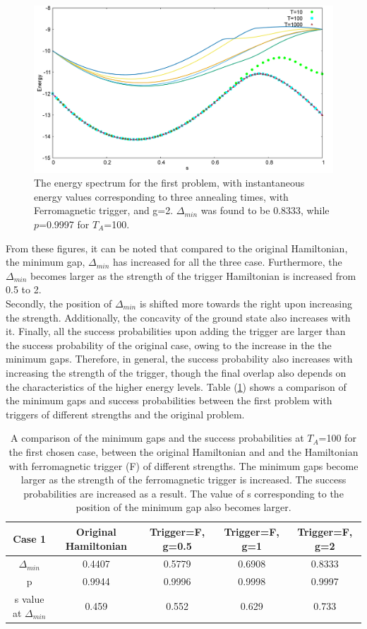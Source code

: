 \documentclass[12]{article}
\begin{document}
\begin{figure}[H]
\centering 
\includegraphics[scale=0.3]{733_s12_F_g2.png}
\caption{The energy spectrum for the first problem, with instantaneous energy values corresponding to three annealing times, with Ferromagnetic trigger, and g=2. $\Delta_{min}$ was found to be 0.8333, while $p$=0.9997 for $T_A$=100.}
\label{fig:f3}
\end{figure}
From these figures, it can be noted that compared to the original Hamiltonian, the minimum gap, $\Delta_{min}$ has increased for all the three case. Furthermore, the $\Delta_{min}$ becomes larger as the strength of the trigger Hamiltonian is increased from 0.5 to 2. \\
Secondly, the position of $\Delta_{min}$ is shifted more towards the right upon increasing the strength. Additionally, the concavity of the ground state also increases with it. 
Finally, all the success probabilities upon adding the trigger are larger than the success probability of the original case, owing to the increase in the the minimum gaps. Therefore, in general, the success probability also increases with increasing the strength of the trigger, though the final overlap also depends on the characteristics of the higher energy levels. 
Table (\ref{tab:f1}) shows a comparison of the minimum gaps and success probabilities between the first problem with triggers of different strengths and the original problem. 
\begin{table}
\centering
\renewcommand{\arraystretch}{1.8}
\begin{tabular}{|c|c|c|c|c|}
\hline 
Case 1 & Original Hamiltonian & Trigger=F, g=0.5 & Trigger=F, g=1 & Trigger=F, g=2 \\ 
\hline 
$\Delta_{min}$ & 0.4407 & 0.5779 & 0.6908 & 0.8333 \\ 
\hline 
p & 0.9944 & 0.9996 & 0.9998 & 0.9997 \\ 
\hline 
s value at $\Delta_{min}$ & 0.459 & 0.552 & 0.629 & 0.733 \\
\hline

\end{tabular} 
\caption{A comparison of the minimum gaps and the success probabilities at $T_A$=100 for the first chosen case, between the original Hamiltonian and and the Hamiltonian with ferromagnetic trigger (F) of different strengths. The minimum gaps become larger as the strength of the ferromagnetic trigger is increased. The success probabilities are increased as a result. The value of s corresponding to the position of the minimum gap also becomes larger.}
\label{tab:f1}
\end{table}
\end{document}
